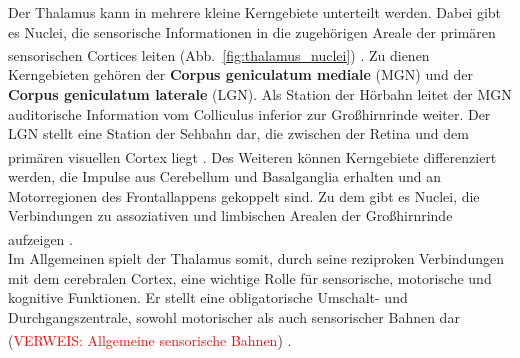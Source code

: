 \documentclass[12pt,a4paper,pdftex]{article}
\begin{document}
\noindent Der Thalamus kann in mehrere kleine Kerngebiete unterteilt werden. Dabei gibt es Nuclei, die sensorische Informationen in die zugehörigen Areale der primären sensorischen Cortices leiten (Abb.~\ref{fig:thalamus_nuclei}) \textsuperscript{\cite[12]{crossman2014neuroanatomy}}. Zu dienen Kerngebieten gehören der \textbf{Corpus geniculatum mediale} (MGN) und der \textbf{Corpus geniculatum laterale} (LGN). Als Station der Hörbahn leitet der MGN auditorische Information vom Colliculus inferior zur Großhirnrinde weiter. Der LGN stellt eine Station der Sehbahn dar, die zwischen der Retina und dem primären visuellen Cortex liegt \textsuperscript{\cite[14]{penzlin2005tierphys}}. Des Weiteren können Kerngebiete differenziert werden, die Impulse aus Cerebellum und Basalganglia erhalten und an Motorregionen des Frontallappens gekoppelt sind. Zu dem gibt es Nuclei, die Verbindungen zu assoziativen und limbischen Arealen der Großhirnrinde aufzeigen \textsuperscript{\cite[12]{crossman2014neuroanatomy}}.\\

\noindent Im Allgemeinen spielt der Thalamus somit, durch seine reziproken Verbindungen mit dem cerebralen Cortex, eine wichtige Rolle für sensorische, motorische und kognitive Funktionen. Er stellt eine obligatorische Umschalt- und Durchgangszentrale, sowohl motorischer als auch sensorischer Bahnen dar (\textcolor{red}{VERWEIS: Allgemeine sensorische Bahnen}) \textsuperscript{\cite[6]{storch2012lehrbuchzoo}}.
\end{document}
